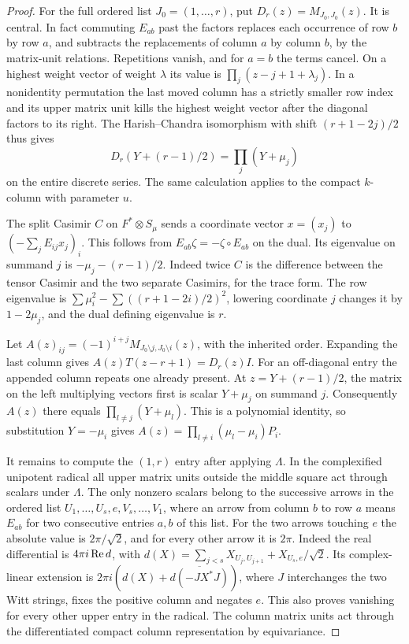 \documentclass[a4paper,11pt]{article}
\theoremstyle{definition}
\theoremstyle{remark}
\numberwithin{equation}{section}
\begin{document}
\begin{proof}
For the full ordered list \(J_0=(1,\ldots,r)\), put
\(D_r(z)=M_{J_0,J_0}(z)\). It is central. In fact commuting
\(E_{ab}\) past the factors replaces each occurrence of row
\(b\) by row \(a\), and subtracts the replacements of column
\(a\) by column \(b\), by the matrix-unit relations. Repetitions
vanish, and for \(a=b\) the terms cancel. On a highest weight
vector of weight \(\lambda\) its value is
\(\prod_j(z-j+1+\lambda_j)\). In a nonidentity permutation
the last moved column has a strictly smaller row index and
its upper matrix unit kills the highest weight vector after
the diagonal factors to its right. The Harish--Chandra
isomorphism with shift \((r+1-2j)/2\) thus gives
\[
 D_r(Y+(r-1)/2)=\prod_j(Y+\mu_j)
\]
on the entire discrete series. The same calculation applies
to the compact \(k\)-column with parameter \(u\).

The split Casimir \(C\) on \(F^*\otimes S_\mu\) sends a
coordinate vector \(x=(x_j)\) to
\((-\sum_jE_{ij}x_j)_i\). This follows from
\(E_{ab}\zeta=-\zeta\circ E_{ab}\) on the dual.
Its eigenvalue on summand \(j\) is
\(-\mu_j-(r-1)/2\). Indeed twice \(C\) is the difference
between the tensor Casimir and the two separate Casimirs,
for the trace form. The row eigenvalue is
\(\sum\mu_i^2-\sum((r+1-2i)/2)^2\), lowering coordinate \(j\)
changes it by \(1-2\mu_j\), and the dual defining eigenvalue
is \(r\).

Let \(A(z)_{ij}=(-1)^{i+j}M_{J_0\setminus j,J_0\setminus i}(z)\),
with the inherited order. Expanding the last column gives
\(A(z)T(z-r+1)=D_r(z)I\). For an off-diagonal entry the
appended column repeats one already present. At
\(z=Y+(r-1)/2\), the matrix on the left multiplying vectors
first is scalar \(Y+\mu_j\) on summand \(j\). Consequently
\(A(z)\) there equals \(\prod_{l\ne j}(Y+\mu_l)\).
This is a polynomial identity, so substitution \(Y=-\mu_i\)
gives \(A(z)=\prod_{l\ne i}(\mu_l-\mu_i)P_i\).

It remains to compute the \((1,r)\) entry after applying
\(\Lambda\). In the complexified unipotent radical all upper
matrix units outside the middle square act through scalars
under \(\Lambda\). The only nonzero scalars belong to the
successive arrows in the ordered list
\(U_1,\ldots,U_s,e,V_s,\ldots,V_1\), where an arrow from
column \(b\) to row \(a\) means \(E_{ab}\) for two consecutive
entries \(a,b\) of this list. For the two arrows touching
\(e\) the absolute value is \(2\pi/\sqrt2\), and for every
other arrow it is \(2\pi\). Indeed the real differential is
\(4\pi i\,{\rm Re}\,d\), with
\(d(X)=\sum_{j<s}X_{U_j,U_{j+1}}+X_{U_s,e}/\sqrt2\).
Its complex-linear extension is
\(2\pi i(d(X)+\overline{d(-JX^*J)})\), where \(J\) interchanges
the two Witt strings, fixes the positive column and negates \(e\).
This also proves vanishing for every other upper entry in the
radical. The column matrix units act through the differentiated
compact column representation by equivariance.


\end{proof}
\end{document}
